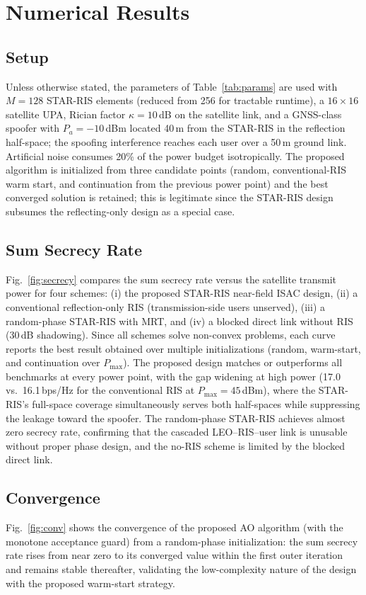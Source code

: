 \section{Numerical Results}\label{sec:results}

\subsection{Setup}
Unless otherwise stated, the parameters of Table~\ref{tab:params} are used with $M=128$ STAR-RIS elements (reduced from 256 for tractable runtime), a $16\times16$ satellite UPA, Rician factor $\kappa=10$\,dB on the satellite link, and a GNSS-class spoofer with $P_a=-10$\,dBm located 40\,m from the STAR-RIS in the reflection half-space; the spoofing interference reaches each user over a 50\,m ground link. Artificial noise consumes 20\% of the power budget isotropically. The proposed algorithm is initialized from three candidate points (random, conventional-RIS warm start, and continuation from the previous power point) and the best converged solution is retained; this is legitimate since the STAR-RIS design subsumes the reflecting-only design as a special case.

\subsection{Sum Secrecy Rate}
Fig.~\ref{fig:secrecy} compares the sum secrecy rate versus the satellite transmit power for four schemes: (i) the proposed STAR-RIS near-field ISAC design, (ii) a conventional reflection-only RIS (transmission-side users unserved), (iii) a random-phase STAR-RIS with MRT, and (iv) a blocked direct link without RIS (30\,dB shadowing). Since all schemes solve non-convex problems, each curve reports the best result obtained over multiple initializations (random, warm-start, and continuation over $P_{\max}$). The proposed design matches or outperforms all benchmarks at every power point, with the gap widening at high power (17.0 vs.\ 16.1\,bps/Hz for the conventional RIS at $P_{\max}=45$\,dBm), where the STAR-RIS's full-space coverage simultaneously serves both half-spaces while suppressing the leakage toward the spoofer. The random-phase STAR-RIS achieves almost zero secrecy rate, confirming that the cascaded LEO--RIS--user link is unusable without proper phase design, and the no-RIS scheme is limited by the blocked direct link.

\subsection{Convergence}
Fig.~\ref{fig:conv} shows the convergence of the proposed AO algorithm (with the monotone acceptance guard) from a random-phase initialization: the sum secrecy rate rises from near zero to its converged value within the first outer iteration and remains stable thereafter, validating the low-complexity nature of the design with the proposed warm-start strategy.

